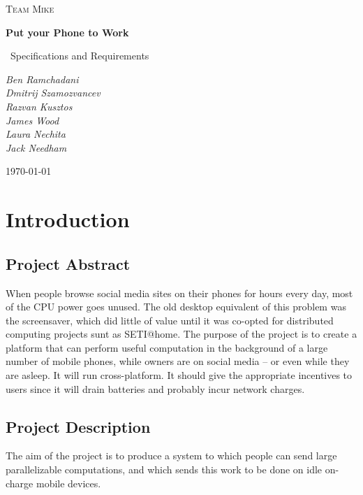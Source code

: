 \documentclass[a4paper,10pt]{article}
\title{}
\author{}
\date{}
\begin{document}
\begin{titlepage}
	\centering
	
	{\scshape\Large Team Mike\par}
	\vspace{4cm}
	{\huge\bfseries Put your Phone to Work\par}
	\vspace{1.5cm}
	{\Large\
	Specifications and Requirements
	\par}
	\vspace{2cm}
	{\Large\itshape 
	      Ben Ramchadani\\
	      Dmitrij Szamozvancev\\
	      Razvan Kusztos\\
	      James Wood \\
	      Laura Nechita \\
	      Jack Needham
	      \par}
	\vfill

	{\large \today\par}
\end{titlepage}
\maketitle
\tableofcontents
\newpage
\section{Introduction}

\subsection{Project Abstract}
When people browse social media sites on their phones for hours every day, most of the CPU power goes unused. The old desktop equivalent of this problem was the screensaver, which did little of value until it was co-opted for distributed computing projects sunt as SETI@home. The purpose of the project is to create a platform that can perform useful computation in the background of a large number of mobile phones, while owners are on social media – or even while they are asleep. It will run cross-platform. It should give the appropriate incentives to users since it will drain batteries and probably incur network charges. 

\subsection{Project Description}
The aim of the project is to produce a system to which people can send large parallelizable computations, and which sends this work to be done on idle on-charge mobile devices.
\end{document}
